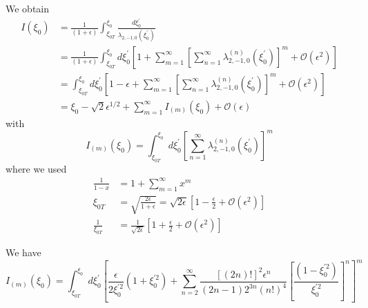 We obtain%
\begin{align*}
I\left(  \xi_{0}\right)   &  =\frac{1}{\left(  1+\epsilon\right)  }\int
_{\xi_{0T}}^{\xi_{0}}\frac{d\xi_{0}^{\prime}}{\lambda_{2,-1,0}\left(  \xi
_{0}^{\prime}\right)  }\\
&  =\frac{1}{\left(  1+\epsilon\right)  }\int_{\xi_{0T}}^{\xi_{0}}d\xi
_{0}^{\prime}\left[  1+\sum_{m=1}^{\infty}\left[  \sum_{n=1}^{\infty}%
\lambda_{2,-1,0}^{(n)}\left(  \xi_{0}^{\prime}\right)  \right]  ^{m}%
+\mathcal{O}\left(  \epsilon^{2}\right)  \right] \\
&  =\int_{\xi_{0T}}^{\xi_{0}}d\xi_{0}^{\prime}\left[  1-\epsilon+\sum
_{m=1}^{\infty}\left[  \sum_{n=1}^{\infty}\lambda_{2,-1,0}^{(n)}\left(
\xi_{0}^{\prime}\right)  \right]  ^{m}+\mathcal{O}\left(  \epsilon^{2}\right)
\right] \\
&  =\xi_{0}-\sqrt{2}\epsilon^{1/2}+\sum_{m=1}^{\infty}I_{\left(  m\right)
}\left(  \xi_{0}\right)  +\mathcal{O}\left(  \epsilon\right)
\end{align*}
with%
\[
I_{\left(  m\right)  }\left(  \xi_{0}\right)  =\int_{\xi_{0T}}^{\xi_{0}}%
d\xi_{0}^{\prime}\left[  \sum_{n=1}^{\infty}\lambda_{2,-1,0}^{(n)}\left(
\xi_{0}^{\prime}\right)  \right]  ^{m}%
\]
where we used
\begin{align}
\frac{1}{1-x}  &  =1+\sum_{m=1}^{\infty}x^{m}\\
\xi_{0T}  &  =\sqrt{\frac{2\epsilon}{1+\epsilon}}=\sqrt{2\epsilon}\left[
1-\frac{\epsilon}{2}+\mathcal{O}\left(  \epsilon^{2}\right)  \right] \\
\frac{1}{\xi_{0T}}  &  =\frac{1}{\sqrt{2\epsilon}}\left[  1+\frac{\epsilon}%
{2}+\mathcal{O}\left(  \epsilon^{2}\right)  \right]
\end{align}

We have%
\[
I_{\left(  m\right)  }\left(  \xi_{0}\right)  =\int_{\xi_{0T}}^{\xi_{0}}%
d\xi_{0}^{\prime}\left[  \frac{\epsilon}{2\xi_{0}^{\prime2}}\left(  1+\xi
_{0}^{\prime2}\right)  +\sum_{n=2}^{\infty}\frac{\left[  \left(  2n\right)
!\right]  ^{2}\epsilon^{n}}{\left(  2n-1\right)  2^{3n}\left(  n!\right)
^{4}}\left[  \frac{\left(  1-\xi_{0}^{\prime2}\right)  }{\xi_{0}^{\prime2}%
}\right]  ^{n}\right]  ^{m}%
\]

